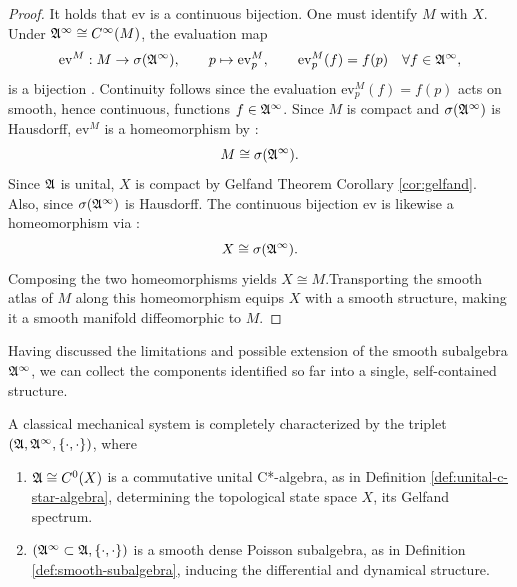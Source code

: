 \begin{proof}
		\noindent It holds that $\mathrm{ev}$ is a continuous bijection. One must identify $M$ with $X$. Under $\mathfrak{A}^\infty \cong C^\infty(M)$, the evaluation map
		\[
		\mathrm{ev}^M : M \to \sigma(\mathfrak{A}^\infty), \qquad
		p \mapsto \mathrm{ev}^M_p, \qquad
		\mathrm{ev}^M_p(f) = f(p) \quad \forall f \in \mathfrak{A}^\infty,
		\]
		is a bijection \cite[Proposition~C.21]{landsmanFoundationsQuantumTheory2017}. Continuity follows since the evaluation $\mathrm{ev}^M_p(f) = f(p)$ acts on smooth, hence continuous, functions $f \in \mathfrak{A}^\infty$. Since $M$ is compact and $\sigma(\mathfrak{A}^\infty)$ is Hausdorff, $\mathrm{ev}^M$ is a homeomorphism by \cite[Theorem~26.6]{munkresTopology2000}:
		$$M \cong \sigma(\mathfrak{A}^\infty).$$
		\noindent Since $\mathfrak{A}$ is unital, $X$ is compact by Gelfand Theorem Corollary \ref{cor:gelfand}. Also, since $\sigma(\mathfrak{A}^\infty)$ is Hausdorff. The continuous bijection $\mathrm{ev}$ is likewise a homeomorphism via \cite[Theorem 26.6]{munkresTopology2000}:
		$$X \cong \sigma(\mathfrak{A}^\infty).$$
		Composing the two homeomorphisms yields $X \cong M$.Transporting the smooth atlas of $M$ along this homeomorphism equips $X$ with a smooth structure, making it a smooth manifold diffeomorphic to $M$.
	\end{proof}
	
	\noindent Having discussed the limitations and possible extension of the smooth subalgebra $\mathfrak{A}^\infty$, we can collect the components identified so far into a single, self-contained structure.
	
	\begin{definition}\label{def:cas}
		A classical mechanical system is completely characterized by the triplet $(\mathfrak{A}, \mathfrak{A}^\infty, \{\cdot,\cdot\})$, where
		\begin{enumerate}
			\item $\mathfrak{A} \cong C^0(X)$ is a commutative unital C*-algebra, as in Definition \ref{def:unital-c-star-algebra}, determining the topological state space $X$, its Gelfand spectrum.
			\item $(\mathfrak{A}^\infty \subset \mathfrak{A}, \{\cdot, \cdot\})$ is a smooth dense Poisson subalgebra, as in Definition \ref{def:smooth-subalgebra}, inducing the differential and dynamical structure.
		\end{enumerate}
	\end{definition}
	
